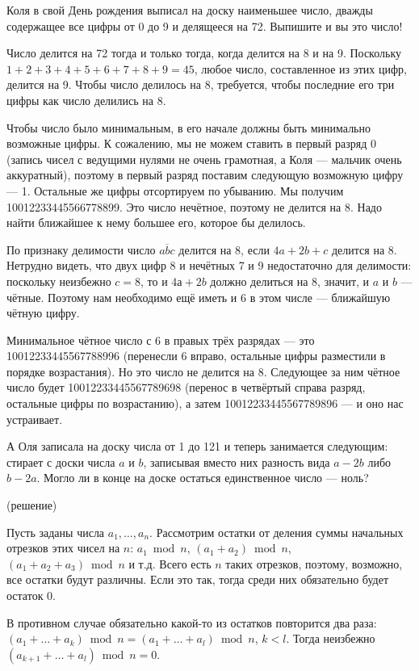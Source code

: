 \begin{itemize}
\itA Коля в свой День рождения выписал на доску наименьшее число, дважды содержащее 
все цифры от 0 до 9 и делящееся на 72. Выпишите и вы это число!


Число делится на 72 тогда и только тогда, когда делится на 8 и на 9.
Поскольку $1+2+3+4+5+6+7+8+9 = 45$, любое число, составленное из этих цифр, делится на 9.
Чтобы число делилось на 8, требуется, чтобы последние его три цифры как число делились
на 8. 

Чтобы число было минимальным, в его начале должны быть минимально возможные цифры.
К сожалению, мы не можем ставить в первый разряд 0 (запись чисел с ведущими нулями не 
очень грамотная, а Коля --- мальчик очень аккуратный), поэтому в первый разряд поставим
следующую возможную цифру --- 1. Остальные же цифры отсортируем по убыванию.
Мы получим 10012233445566778899. 
Это число нечётное, поэтому не делится на 8.
Надо найти ближайшее к нему большее его, которое бы делилось.

По признаку
делимости число $\overline{abc}$ делится на 8, если $4a + 2b +c$ делится на 8.
Нетрудно видеть, что двух цифр 8 и нечётных 7 и 9 недостаточно для делимости:
поскольку неизбежно $c = 8$, то и $4а + 2b$ должно делиться на 8, значит, 
и $a$ и $b$ --- чётные. Поэтому нам необходимо ещё иметь и 6 в этом числе --- ближайшую
чётную цифру.

Минимальное чётное число с 6 в правых трёх разрядах --- это 10012233445567788996
(перенесли 6 вправо, остальные цифры разместили в порядке возрастания).
Но это число не делится на 8. Следующее за ним чётное число будет 10012233445567789698 (перенос в четвёртый
справа разряд, остальные цифры по возрастанию),
а затем 10012233445567789896 --- и оно нас устраивает.

\itB А Оля записала на доску числа от 1 до 121 и теперь занимается следующим: 
стирает с доски числа $a$ и $b$, записывая вместо них разность вида $a-2b$ либо $b-2a$. 
Могло ли в конце на доске остаться единственное число — ноль?


(решение)

\itC Пусть заданы числа $a_1, \dots, a_n$. Рассмотрим остатки от деления суммы начальных 
отрезков этих чисел на $n$:
$a_1 \bmod n$, $(a_1+a_2) \bmod n$, $(a_1+a_2+a_3) \bmod n$ и т.д. 
Всего есть $n$ таких отрезков, поэтому, возможно, все остатки будут различны.
Если это так, тогда среди них обязательно будет остаток 0. 

В противном случае обязательно какой-то из остатков повторится два раза:
$(a_1 + \dots + a_k) \bmod n = (a_1 + \dots + a_l) \bmod n$, $k < l$. Тогда
неизбежно $(a_{k+1} + \dots + a_l) \bmod n = 0$.

\end{itemize}